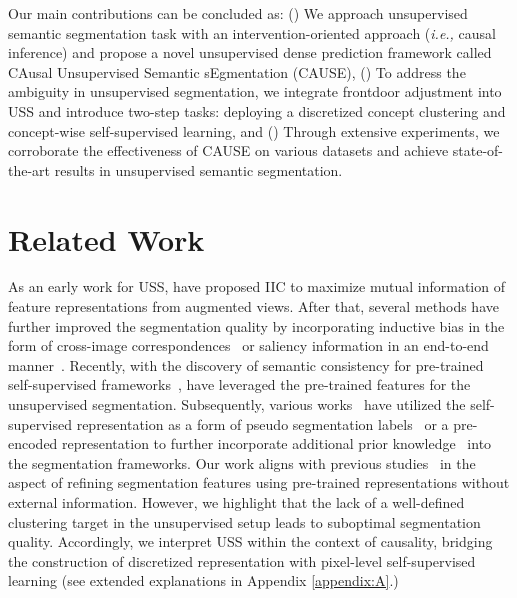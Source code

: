 \documentclass{article} \usepackage{iclr2024_conference,times}
\begin{document}
Our main contributions can be concluded as: (\lowercase\expandafter{}) We approach unsupervised semantic segmentation task with an intervention-oriented approach (\textit{i.e.,} causal inference) and propose a novel unsupervised dense prediction framework called CAusal Unsupervised Semantic sEgmentation (CAUSE), (\lowercase\expandafter{}) 
To address the ambiguity in unsupervised segmentation, we integrate frontdoor adjustment into USS and introduce two-step tasks: deploying a discretized concept clustering and concept-wise self-supervised learning, and (\lowercase\expandafter{}) Through extensive experiments, we corroborate the effectiveness of CAUSE on various datasets and achieve state-of-the-art results in unsupervised semantic segmentation.







\section{Related Work}
\label{sec:2}
As an early work for USS, \citet{ji2019invariant} have proposed IIC to maximize mutual information of feature representations from augmented views. After that, several methods have further improved the segmentation quality by incorporating inductive bias in the form of cross-image correspondences~\citep{hwang2019segsort,cho2021picie,wen2022selfsupervised} or saliency information in an end-to-end manner~\citep{van2021unsupervised, ke2022unsupervised}. Recently, with the discovery of semantic consistency for pre-trained self-supervised frameworks~\citep{caron2021emerging}, \citet{hamilton2022unsupervised} have leveraged the pre-trained features for the unsupervised segmentation. Subsequently, various works~\citep{wen2022selfsupervised, yin2022transfgu, ziegler2022self} have utilized the self-supervised representation as a form of pseudo segmentation labels~\citep{zadaianchuk2023unsupervised, liacseg} or a pre-encoded representation to further incorporate additional prior knowledge~\citep{van2021unsupervised, zadaianchuk2023unsupervised} into the segmentation frameworks. Our work aligns with previous studies~\citep{hamilton2022unsupervised, seong2023leveraging} in the aspect of refining segmentation features using pre-trained representations without external information. However, we highlight that the lack of a well-defined clustering target in the unsupervised setup leads to suboptimal segmentation quality. Accordingly, we interpret USS within the context of causality, bridging the construction of discretized representation with pixel-level self-supervised learning (see extended explanations in Appendix \ref{appendix:A}.)
\end{document}
